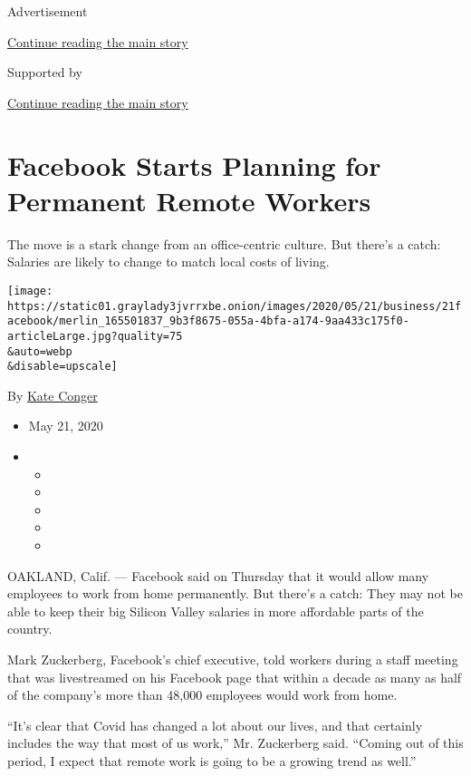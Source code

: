 Advertisement

\protect\hyperlink{after-top}{Continue reading the main story}

Supported by

\protect\hyperlink{after-sponsor}{Continue reading the main story}

\hypertarget{facebook-starts-planning-for-permanent-remote-workers}{%
\section{Facebook Starts Planning for Permanent Remote
Workers}\label{facebook-starts-planning-for-permanent-remote-workers}}

The move is a stark change from an office-centric culture. But there's a
catch: Salaries are likely to change to match local costs of living.

\texttt{[image: https://static01.graylady3jvrrxbe.onion/images/2020/05/21/business/21facebook/merlin\_165501837\_9b3f8675-055a-4bfa-a174-9aa433c175f0-articleLarge.jpg?quality=75\\\&auto=webp\\\&disable=upscale]}

By \href{https://www.nytimes3xbfgragh.onion/by/kate-conger}{Kate Conger}

\begin{itemize}
\item
  May 21, 2020
\item
  \begin{itemize}
  \item
  \item
  \item
  \item
  \item
  \end{itemize}
\end{itemize}

OAKLAND, Calif. --- Facebook said on Thursday that it would allow many
employees to work from home permanently. But there's a catch: They may
not be able to keep their big Silicon Valley salaries in more affordable
parts of the country.

Mark Zuckerberg, Facebook's chief executive, told workers during a staff
meeting that was livestreamed on his Facebook page that within a decade
as many as half of the company's more than 48,000 employees would work
from home.

``It's clear that Covid has changed a lot about our lives, and that
certainly includes the way that most of us work,'' Mr. Zuckerberg said.
``Coming out of this period, I expect that remote work is going to be a
growing trend as well.''

